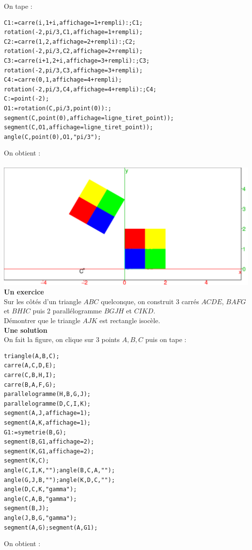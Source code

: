 \documentclass[a4paper,11pt]{book}
\begin{document}
On tape :
\begin{verbatim}
C1:=carre(i,1+i,affichage=1+rempli):;C1;
rotation(-2,pi/3,C1,affichage=1+rempli);
C2:=carre(1,2,affichage=2+rempli):;C2;
rotation(-2,pi/3,C2,affichage=2+rempli);
C3:=carre(i+1,2+i,affichage=3+rempli):;C3;
rotation(-2,pi/3,C3,affichage=3+rempli);
C4:=carre(0,1,affichage=4+rempli);
rotation(-2,pi/3,C4,affichage=4+rempli):;C4;
C:=point(-2);
O1:=rotation(C,pi/3,point(0)):;
segment(C,point(0),affichage=ligne_tiret_point));
segment(C,O1,affichage=ligne_tiret_point));
angle(C,point(0),O1,"pi/3");
\end{verbatim}
On obtient :\\
\ \\
\includegraphics[width=\textwidth]{damierrot}
{\bf Un exercice}\\
Sur les c\^ot\'es d'un triangle $ABC$ quelconque, on construit 3 carr\'es
$ACDE$, $BAFG$ et $BHIC$ puis 2 parall\'elogramme $BGJH$ et $CIKD$.\\
D\'emontrer que le triangle $AJK$ est rectangle isoc\`ele.\\
{\bf Une solution}\\
On fait la figure, on clique sur 3 points $A,B,C$ puis on tape :
\begin{verbatim}
triangle(A,B,C);
carre(A,C,D,E);
carre(C,B,H,I);
carre(B,A,F,G);
parallelogramme(H,B,G,J);
parallelogramme(D,C,I,K);
segment(A,J,affichage=1);
segment(A,K,affichage=1);
G1:=symetrie(B,G);
segment(B,G1,affichage=2);
segment(K,G1,affichage=2);
segment(K,C);
angle(C,I,K,"");angle(B,C,A,"");
angle(G,J,B,"");angle(K,D,C,"");
angle(D,C,K,"gamma");
angle(C,A,B,"gamma");
segment(B,J);
angle(J,B,G,"gamma");
segment(A,G);segment(A,G1);
\end{verbatim}
On obtient :\\
\end{document}
